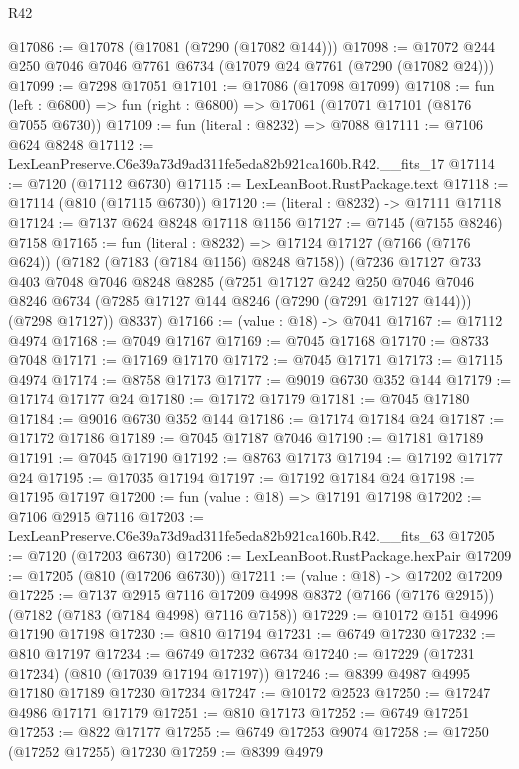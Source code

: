 \begin{lexlean}{R42}
\begin{coremodule}
{@17086 := @17078 (@17081 (@7290 (@17082 @144)))
@17098 := @17072 @244 @250 @7046 @7046 @7761 @6734 (@17079 @24 @7761 (@7290 (@17082 @24)))
@17099 := @7298 @17051
@17101 := @17086 (@17098 @17099)
@17108 := fun (left : @6800) => fun (right : @6800) => @17061 (@17071 @17101 (@8176 @7055 @6730))
@17109 := fun (literal : @8232) => @7088
@17111 := @7106 @624 @8248
@17112 := LexLeanPreserve.C6e39a73d9ad311fe5eda82b921ca160b.R42.__fits_17
@17114 := @7120 (@17112 @6730)
@17115 := LexLeanBoot.RustPackage.text
@17118 := @17114 (@810 (@17115 @6730))
@17120 := (literal : @8232) -> @17111 @17118
@17124 := @7137 @624 @8248 @17118 @1156
@17127 := @7145 (@7155 @8246) @7158
@17165 := fun (literal : @8232) =>
  @17124
    @17127
    (@7166 (@7176 @624))
    (@7182 (@7183 (@7184 @1156) @8248 @7158))
    (@7236
      @17127
      @733
      @403
      @7048
      @7046
      @8248
      @8285
      (@7251
        @17127
        @242
        @250
        @7046
        @7046
        @8246
        @6734
        (@7285 @17127 @144 @8246 (@7290 (@7291 @17127 @144)))
        (@7298 @17127))
      @8337)
@17166 := (value : @18) -> @7041
@17167 := @17112 @4974
@17168 := @7049 @17167
@17169 := @7045 @17168
@17170 := @8733 @7048
@17171 := @17169 @17170
@17172 := @7045 @17171
@17173 := @17115 @4974
@17174 := @8758 @17173
@17177 := @9019 @6730 @352 @144
@17179 := @17174 @17177 @24
@17180 := @17172 @17179
@17181 := @7045 @17180
@17184 := @9016 @6730 @352 @144
@17186 := @17174 @17184 @24
@17187 := @17172 @17186
@17189 := @7045 @17187 @7046
@17190 := @17181 @17189
@17191 := @7045 @17190
@17192 := @8763 @17173
@17194 := @17192 @17177 @24
@17195 := @17035 @17194
@17197 := @17192 @17184 @24
@17198 := @17195 @17197
@17200 := fun (value : @18) => @17191 @17198
@17202 := @7106 @2915 @7116
@17203 := LexLeanPreserve.C6e39a73d9ad311fe5eda82b921ca160b.R42.__fits_63
@17205 := @7120 (@17203 @6730)
@17206 := LexLeanBoot.RustPackage.hexPair
@17209 := @17205 (@810 (@17206 @6730))
@17211 := (value : @18) -> @17202 @17209
@17225 := @7137
    @2915
    @7116
    @17209
    @4998
    @8372
    (@7166 (@7176 @2915))
    (@7182 (@7183 (@7184 @4998) @7116 @7158))
@17229 := @10172 @151 @4996 @17190 @17198
@17230 := @810 @17194
@17231 := @6749 @17230
@17232 := @810 @17197
@17234 := @6749 @17232 @6734
@17240 := @17229 (@17231 @17234) (@810 (@17039 @17194 @17197))
@17246 := @8399 @4987 @4995 @17180 @17189 @17230 @17234
@17247 := @10172 @2523
@17250 := @17247 @4986 @17171 @17179
@17251 := @810 @17173
@17252 := @6749 @17251
@17253 := @822 @17177
@17255 := @6749 @17253 @9074
@17258 := @17250 (@17252 @17255) @17230
@17259 := @8399 @4979
}
\end{coremodule}
\end{lexlean}
